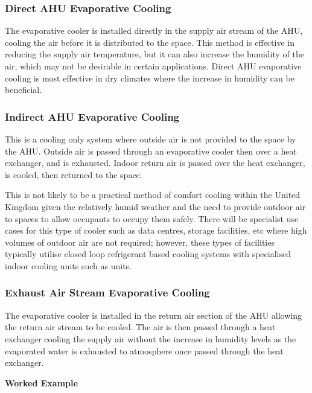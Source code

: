 \subsubsection{Direct AHU Evaporative Cooling}

The evaporative cooler is installed directly in the supply air stream of the \gls{AHU}, cooling the air before it is distributed to the space. This method is effective in reducing the supply air temperature, but it can also increase the humidity of the air, which may not be desirable in certain applications. Direct AHU evaporative cooling is most effective in dry climates where the increase in humidity can be beneficial.


\subsubsection{Indirect AHU Evaporative Cooling}

This is a cooling only system where outside air is not provided to the space by the AHU. Outside air is passed through an evaporative cooler then over a heat exchanger, and is exhausted. Indoor return air is passed over the heat exchanger, is cooled, then returned to the space.

This is not likely to be a practical method of comfort cooling within the United Kingdom given the relatively humid weather and the need to provide outdoor air to spaces to allow occupants to occupy them safely. There will be specialist use cases for this type of cooler such as data centres, storage facilities, etc where high volumes of outdoor air are not required; however, these types of facilities typically utilise closed loop refrigerant based cooling systems with specialised indoor cooling units such as  units.

\subsubsection{Exhaust Air Stream Evaporative Cooling}

The evaporative cooler is installed in the return air section of the \gls{AHU} allowing the return air stream to be cooled. The air is then passed through a heat exchanger cooling the supply air without the increase in humidity levels as the evaporated water is exhausted to atmosphere once passed through the heat exchanger.

\textbf{Worked Example}

